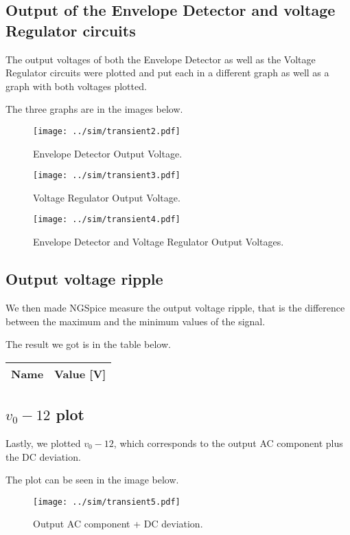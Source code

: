 \subsection{Output of the Envelope Detector and voltage Regulator circuits}
The output voltages of both the Envelope Detector as well as the Voltage Regulator circuits were plotted and put each in a different graph as well as a graph with both voltages plotted. \par
The three graphs are in the images below.

\begin{figure}[H] \centering
\texttt{[image: ../sim/transient2.pdf]}
\caption{Envelope Detector Output Voltage.}
\label{fig:transient2}
\end{figure}

\begin{figure}[H] \centering
\texttt{[image: ../sim/transient3.pdf]}
\caption{Voltage Regulator Output Voltage.}
\label{fig:transient3}
\end{figure}

\begin{figure}[H] \centering
\texttt{[image: ../sim/transient4.pdf]}
\caption{Envelope Detector and Voltage Regulator Output Voltages.}
\label{fig:transient4}
\end{figure}

\subsection{Output voltage ripple}
We then made NGSpice measure the output voltage ripple, that is the difference between the maximum and the minimum values of the signal. \par
The result we got is in the table below.

\begin{table}[H]
  \centering
  \begin{tabular}{|l|r|}
    \hline    
    {\bf Name} & {\bf Value [V]} \\ \hline
    
  \end{tabular}
  \label{tab:ripple}
\end{table}

\subsection{$v_0 - 12$ plot}
Lastly, we plotted $v_0 - 12$, which corresponds to the output AC component plus the DC deviation. \par
The plot can be seen in the image below.

\begin{figure}[H] \centering
\texttt{[image: ../sim/transient5.pdf]}
\caption{Output AC component + DC deviation.}
\label{fig:transient5}
\end{figure}




